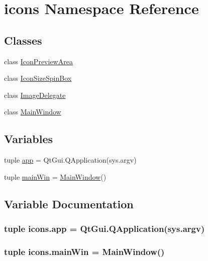 \hypertarget{namespaceicons}{}\section{icons Namespace Reference}
\label{namespaceicons}
\subsection*{Classes}
\begin{DoxyCompactItemize}
\item 
class \hyperlink{classicons_1_1IconPreviewArea}{Icon\+Preview\+Area}
\item 
class \hyperlink{classicons_1_1IconSizeSpinBox}{Icon\+Size\+Spin\+Box}
\item 
class \hyperlink{classicons_1_1ImageDelegate}{Image\+Delegate}
\item 
class \hyperlink{classicons_1_1MainWindow}{Main\+Window}
\end{DoxyCompactItemize}
\subsection*{Variables}
\begin{DoxyCompactItemize}
\item 
tuple \hyperlink{namespaceicons_a04a3235fc10087ec8621f0eef4f65200}{app} = Qt\+Gui.\+Q\+Application(sys.\+argv)
\item 
tuple \hyperlink{namespaceicons_adf34be12c3b69b27f591dc1d54ae819c}{main\+Win} = \hyperlink{classicons_1_1MainWindow}{Main\+Window}()
\end{DoxyCompactItemize}


\subsection{Variable Documentation}
\hypertarget{namespaceicons_a04a3235fc10087ec8621f0eef4f65200}{}
\subsubsection[{app}]{\setlength{\rightskip}{0pt plus 5cm}tuple icons.\+app = Qt\+Gui.\+Q\+Application(sys.\+argv)}\label{namespaceicons_a04a3235fc10087ec8621f0eef4f65200}
\hypertarget{namespaceicons_adf34be12c3b69b27f591dc1d54ae819c}{}
\subsubsection[{main\+Win}]{\setlength{\rightskip}{0pt plus 5cm}tuple icons.\+main\+Win = {\bf Main\+Window}()}\label{namespaceicons_adf34be12c3b69b27f591dc1d54ae819c}
